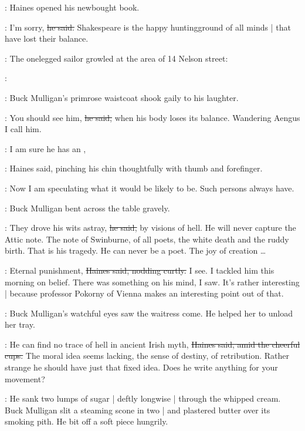 :
Haines opened his newbought book.%

\haines:
I'm sorry,
\sout{he said.}
Shakespeare is the happy huntingground of all minds |
that have lost their balance.

\pagebreak[4]
\begin{interject}
    :
    The onelegged sailor growled at the area of 14 Nelson street:

    \smallskip
    \noindent\sailor:
\end{interject}

:
Buck Mulligan's primrose waistcoat shook gaily to his laughter.

\mulligan:
You should see him,
\sout{he said,}
when his body loses its balance.
Wandering Aengus I call him.

\haines:
I am sure he has an ,

:
Haines said,
pinching his chin thoughtfully with thumb and forefinger.

\haines:
Now I am speculating what it would be likely to be.%
Such persons always have.

:
Buck Mulligan bent across the table gravely.

\mulligan:
They drove his wits astray,
\sout{he said,}
by visions of hell.
He will never capture the Attic note.
The note of Swinburne,
of all poets,
the white death and the ruddy birth.
That is his tragedy.
He can never be a poet.
The joy of creation \ldots

\haines:
Eternal punishment,
\sout{Haines said,
nodding curtly.}
I see.
I tackled him
this morning on belief.
There was something on his mind, I saw.
It's rather interesting |
because professor Pokorny of Vienna
makes an interesting point out of that.

:
Buck Mulligan's watchful eyes saw the waitress come.%
He helped her to unload her tray.

\haines:
He can find no trace of hell in ancient Irish myth,
\sout{Haines said,
amid the cheerful cups.}
The moral idea seems lacking,
the sense of destiny, of retribution.
Rather strange he should have just that fixed idea.
Does he write anything for your movement?

:
He sank two lumps of sugar |
deftly longwise |
through the whipped cream.
Buck Mulligan slit a steaming scone in two |
and plastered butter
over its smoking pith.
He bit off a soft piece hungrily.

